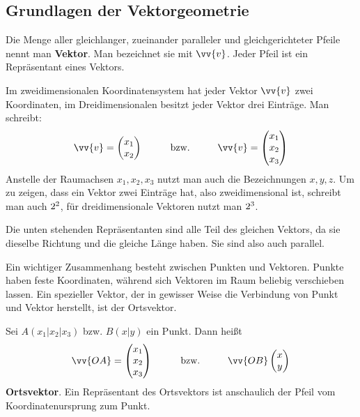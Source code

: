 \documentclass[ngerman, 12pt]{nssheetxea}
\begin{document}
\subsection{Grundlagen der Vektorgeometrie}
\begin{definition}
Die Menge aller gleichlanger, zueinander paralleler und gleichgerichteter Pfeile nennt man \textbf{Vektor}. Man bezeichnet sie mit $\vv{v}$. Jeder Pfeil ist ein Repräsentant eines Vektors. \par
Im zweidimensionalen Koordinatensystem hat jeder Vektor $\vv{v}$ zwei Koordinaten, im Dreidimensionalen besitzt jeder Vektor drei Einträge. Man schreibt:
\[ \vv{v} = \begin{pmatrix}
x_1 \\ x_2
\end{pmatrix} \hspace{1cm} \text{bzw.} \hspace{1cm} \vv{v} = \begin{pmatrix}
x_1 \\ x_2 \\ x_3
\end{pmatrix} \]
Anstelle der Raumachsen $x_1, x_2, x_3$ nutzt man auch die Bezeichnungen $x,y,z$. Um zu zeigen, dass ein Vektor zwei Einträge hat, also zweidimensional ist, schreibt man auch $2^2$, für dreidimensionale Vektoren nutzt man $2^3$.
\end{definition}

\begin{example}
Die unten stehenden Repräsentanten sind alle Teil des gleichen Vektors, da sie dieselbe Richtung und die gleiche Länge haben. Sie sind also auch parallel.
\begin{center}
\end{center}
\end{example}

Ein wichtiger Zusammenhang besteht zwischen Punkten und Vektoren. Punkte haben feste Koordinaten, während sich Vektoren im Raum beliebig verschieben lassen. Ein spezieller Vektor, der in gewisser Weise die Verbindung von Punkt und Vektor herstellt, ist der Ortsvektor.

\begin{definition}
Sei $A(x_1|x_2|x_3)$ bzw. $B(x|y)$ ein Punkt. Dann heißt 
\[ \vv{OA} = \begin{pmatrix} x_1 \\ x_2 \\ x_3 \end{pmatrix} \hspace{1cm} \text{bzw.} \hspace{1cm} \vv{OB} \begin{pmatrix} x \\ y  \end{pmatrix} \]
\textbf{Ortsvektor}. Ein Repräsentant des Ortsvektors ist anschaulich der Pfeil vom Koordinatenursprung zum Punkt.
 
\end{definition}
\end{document}
